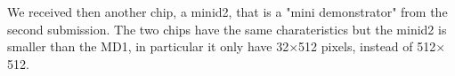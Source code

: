 


    We received then another chip, a minid2, that is a "mini demonstrator" from the second submission. The two chips have the same charateristics but the minid2 is smaller than the MD1, in particular it only have 32$\times$512 pixels, instead of 512$\times$512.  


